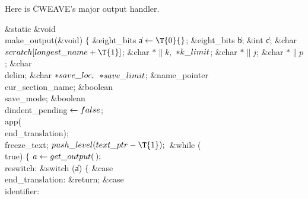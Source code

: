 Here is \.{CWEAVE}'s major output handler.

\Y\B\1\1\&{static} \&{void} \\{make\_output}(\&{void})\2\2\6
${}\{{}$\1\6
\&{eight\_bits} \|a${}\K\T{0}{}$;\6
\&{eight\_bits} \|b;\6
\&{int} \|c;\6
\&{char} ${}\\{scratch}[\\{longest\_name}+\T{1}]{}$;\6
\&{char} ${}{*}\|k,{}$ ${}{*}\\{k\_limit}{}$;\6
\&{char} ${}{*}\|j{}$;\6
\&{char} ${}{*}\|p{}$;\6
\&{char} \\{delim};\6
\&{char} ${}{*}\\{save\_loc},{}$ ${}{*}\\{save\_limit}{}$;\6
\&{name\_pointer} \\{cur\_section\_name};\6
\&{boolean} \\{save\_mode};\6
\&{boolean} \\{dindent\_pending}${}\leftarrow\\{false}{}$;\7
\\{app}(\\{end\_translation});\6
\\{freeze\_text};\6
${}\\{push\_level}(\\{text\_ptr}-\T{1});{}$\6
\&{while} (\\{true})\5
${}\{{}$\1\6
${}\|a\K\\{get\_output}(\,);{}$\6
\4\\{reswitch}:\6
\&{switch} (\|a)\5
${}\{{}$\1\6
\4\&{case} \\{end\_translation}:\5
\&{return};\6
\4\&{case} \\{identifier}:\5
